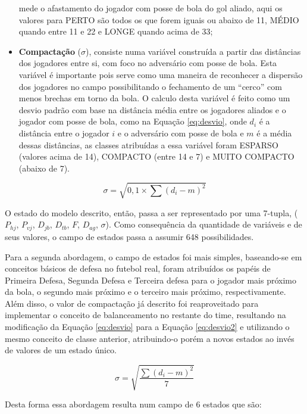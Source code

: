 \begin{itemize}
    mede o afastamento do jogador com posse de bola do gol aliado, aqui os
    valores para PERTO são todos os que forem iguais ou abaixo de 11, MÉDIO
    quando entre 11 e 22 e LONGE quando acima de 33;
    \item \textbf{Compactação} ($\sigma$), consiste numa variável construída a
    partir das distâncias dos jogadores entre si, com foco no adversário com
    posse de bola. Esta variável é importante pois serve como uma maneira de
    reconhecer a dispersão dos jogadores no campo possibilitando o fechamento de
    um ``cerco'' com menos brechas em torno da bola. O calculo desta variável é
    feito como um desvio padrão com base na distância média entre os jogadores
    aliados e o jogador com posse de bola, como na Equação \ref{eq:desvio}, onde
    $d_i$ é a distância entre o jogador $i$ e o adversário com posse de bola e
    $m$ é a média dessas distâncias, as classes atribuídas a essa variável foram
    ESPARSO (valores acima de 14), COMPACTO (entre 14 e 7) e MUITO COMPACTO
    (abaixo de 7).
\end{itemize}

\begin{equation}
    \sigma=\sqrt{0,1\times \sum{(d_i - m)^2}}
    \label{eq:desvio}
\end{equation}

O estado do modelo descrito, então, passa a ser representado por uma 7-tupla,
($P_{hj}$, $P_{vj}$, $D_{jb}$, $D_{tb}$, $F$, $D_{ag}$, $\sigma$). Como
consequência da quantidade de variáveis e de seus valores, o campo de estados
passa a assumir 648 possibilidades.

Para a segunda abordagem, o campo de estados foi mais simples, baseando-se em
conceitos básicos de defesa no futebol real, foram atribuídos os papéis de
Primeira Defesa, Segunda Defesa e Terceira defesa para o jogador mais próximo da
bola, o segundo mais próximo e o terceiro mais próximo, respectivamente. Além
disso, o valor de compactação já descrito foi reaproveitado para implementar o
conceito de balanceamento no restante do time, resultando na modificação da
Equação \ref{eq:desvio} para a Equação \ref{eq:desvio2} e utilizando o mesmo
conceito de classe anterior, atribuindo-o porém a novos estados ao invés de
valores de um estado único.

\begin{equation}
    \sigma=\sqrt{\frac{\sum{(d_i - m)^2}}{7}}
    \label{eq:desvio2}
\end{equation}

Desta forma essa abordagem resulta num campo de 6 estados que são:

